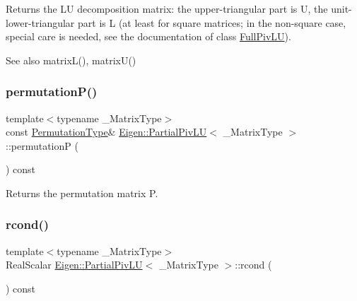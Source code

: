 \begin{DoxyReturn}{Returns}
the LU decomposition matrix\+: the upper-\/triangular part is U, the unit-\/lower-\/triangular part is L (at least for square matrices; in the non-\/square case, special care is needed, see the documentation of class \mbox{\hyperlink{class_eigen_1_1_full_piv_l_u}{Full\+Piv\+LU}}).
\end{DoxyReturn}
\begin{DoxySeeAlso}{See also}
matrix\+L(), matrix\+U() 
\end{DoxySeeAlso}
\mbox{\label{class_eigen_1_1_partial_piv_l_u_a1c637530b3215787668a75ebb2e7b882}} 
\subsubsection{\texorpdfstring{permutationP()}{permutationP()}}
{\footnotesize\ttfamily template$<$typename \+\_\+\+Matrix\+Type$>$ \\
const \mbox{\hyperlink{class_eigen_1_1_permutation_matrix}{Permutation\+Type}}\& \mbox{\hyperlink{class_eigen_1_1_partial_piv_l_u}{Eigen\+::\+Partial\+Piv\+LU}}$<$ \+\_\+\+Matrix\+Type $>$\+::permutationP (\begin{DoxyParamCaption}{ }\end{DoxyParamCaption}) const\hspace{0.3cm}{\ttfamily [inline]}}

\begin{DoxyReturn}{Returns}
the permutation matrix P. 
\end{DoxyReturn}
\mbox{\label{class_eigen_1_1_partial_piv_l_u_a472b46d5d9ff7c328e1dccc13805f690}} 
\subsubsection{\texorpdfstring{rcond()}{rcond()}}
{\footnotesize\ttfamily template$<$typename \+\_\+\+Matrix\+Type$>$ \\
Real\+Scalar \mbox{\hyperlink{class_eigen_1_1_partial_piv_l_u}{Eigen\+::\+Partial\+Piv\+LU}}$<$ \+\_\+\+Matrix\+Type $>$\+::rcond (\begin{DoxyParamCaption}{ }\end{DoxyParamCaption}) const\hspace{0.3cm}{\ttfamily [inline]}}

